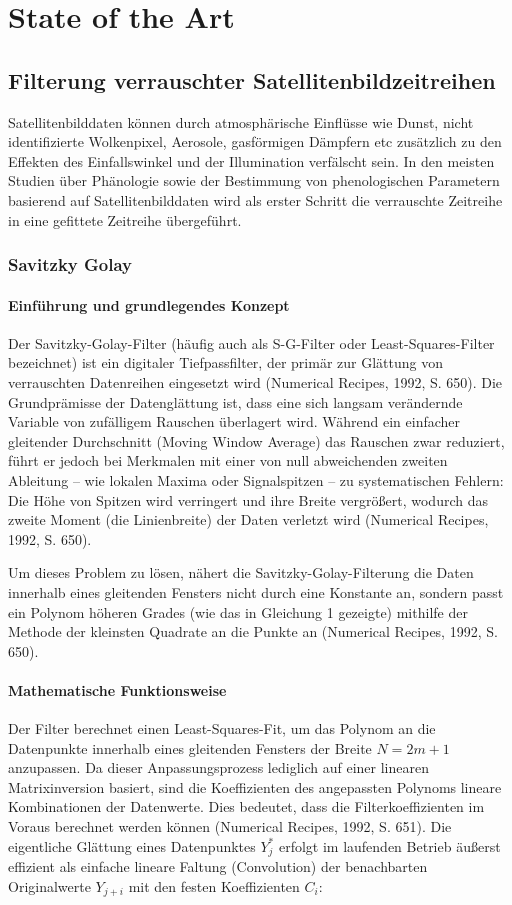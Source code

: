 \documentclass[11pt]{report}
\begin{document}
\chapter{State of the Art}
\section{Filterung verrauschter Satellitenbildzeitreihen}
Satellitenbilddaten können durch atmosphärische Einflüsse wie Dunst, nicht identifizierte Wolkenpixel, Aerosole, gasförmigen Dämpfern etc zusätzlich zu den Effekten des Einfallswinkel und der Illumination verfälscht sein. In den meisten Studien über Phänologie sowie der Bestimmung  von phenologischen Parametern basierend auf Satellitenbilddaten wird als erster Schritt die verrauschte Zeitreihe in eine gefittete Zeitreihe übergeführt.

\subsection{Savitzky Golay}


\subsubsection{Einführung und grundlegendes Konzept}
Der Savitzky-Golay-Filter (häufig auch als S-G-Filter oder Least-Squares-Filter bezeichnet) ist ein digitaler Tiefpassfilter, der primär zur Glättung von verrauschten Datenreihen eingesetzt wird (Numerical Recipes, 1992, S. 650). Die Grundprämisse der Datenglättung ist, dass eine sich langsam verändernde Variable von zufälligem Rauschen überlagert wird. Während ein einfacher gleitender Durchschnitt (Moving Window Average) das Rauschen zwar reduziert, führt er jedoch bei Merkmalen mit einer von null abweichenden zweiten Ableitung – wie lokalen Maxima oder Signalspitzen – zu systematischen Fehlern: Die Höhe von Spitzen wird verringert und ihre Breite vergrößert, wodurch das zweite Moment (die Linienbreite) der Daten verletzt wird (Numerical Recipes, 1992, S. 650).

Um dieses Problem zu lösen, nähert die Savitzky-Golay-Filterung die Daten innerhalb eines gleitenden Fensters nicht durch eine Konstante an, sondern passt ein Polynom höheren Grades (wie das in Gleichung 1 gezeigte) mithilfe der Methode der kleinsten Quadrate an die Punkte an (Numerical Recipes, 1992, S. 650). 

\subsubsection{Mathematische Funktionsweise}
Der Filter berechnet einen Least-Squares-Fit, um das Polynom an die Datenpunkte innerhalb eines gleitenden Fensters der Breite $N = 2m+1$ anzupassen. Da dieser Anpassungsprozess lediglich auf einer linearen Matrixinversion basiert, sind die Koeffizienten des angepassten Polynoms lineare Kombinationen der Datenwerte. Dies bedeutet, dass die Filterkoeffizienten im Voraus berechnet werden können (Numerical Recipes, 1992, S. 651). Die eigentliche Glättung eines Datenpunktes $Y_j^*$ erfolgt im laufenden Betrieb äußerst effizient als einfache lineare Faltung (Convolution) der benachbarten Originalwerte $Y_{j+i}$ mit den festen Koeffizienten $C_i$:
\end{document}

